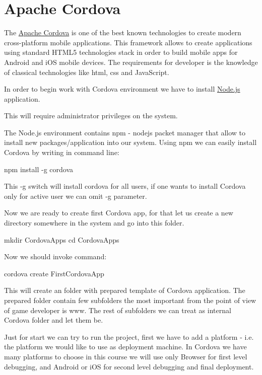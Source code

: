 
\chapter{Apache Cordova}

The \href{https://cordova.apache.org}{Apache Cordova} is one of the best known technologies to create modern cross-platform mobile applications. This framework allows to create applications using standard HTML5 technologies stack in order to build mobile apps for Android and iOS mobile devices. The requirements for developer is the knowledge of classical technologies like html, css and JavaScript.

In order to begin work with Cordova environment we have to install \href{http://nodejs.org}{Node.js} application. \begin{warning} This will require administrator privileges on the system.\end{warning} The Node.js environment contains npm - nodejs packet manager that allow to install new packages/application into our system. Using npm we can easily install Cordova by writing in command line:

\begin{shell}
npm install -g cordova
\end{shell}

This -g switch will install cordova for all users, if one wants to install Cordova only for active user we can omit -g parameter.

Now we are ready to create first Cordova app, for that let us create a new directory somewhere in the system and go into this folder.

\begin{shell}
mkdir CordovaApps
cd CordovaApps
\end{shell}

Now we should invoke command:
\begin{shell}
cordova create FirstCordovaApp
\end{shell}

This will create an folder with prepared template of Cordova application. The prepared folder contain few subfolders the most important from the point of view of game developer is www. The rest of subfolders we can treat as internal Cordova folder and let them be.

Just for start we can try to run the project, first we have to add a platform - i.e. the platform we would like to use as deployment machine. In Cordova we have many platforms to choose in this course we will use only Browser for first level debugging, and Android or iOS for second level debugging and final deployment.

